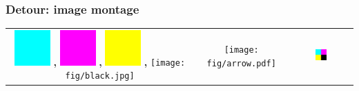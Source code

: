 \documentclass[english,serif,mathserif,xcolor=pdftex,dvipsnames,table]{beamer}
\begin{document}
\begin{frame}[fragile]
  \frametitle{Detour: image montage}


  \+
  \begin{tabular}[c]{ccc}
    \begin{minipage}[c]{0.45\linewidth}
      \includegraphics[width=0.2\textwidth]{fig/cyan.jpg}    \textbf{,}
      \includegraphics[width=0.2\textwidth]{fig/magenta.jpg} \textbf{,}
      \includegraphics[width=0.2\textwidth]{fig/yellow.jpg}  \textbf{,}
      \texttt{[image: fig/black.jpg]}
      \vspace{0.2\textheight}
    \end{minipage}
    &
    {\texttt{[image: fig/arrow.pdf]}}
    &
    \includegraphics[width=0.2\textwidth]{fig/cmyk.jpg}
  \end{tabular}
\end{frame}
\end{document}
